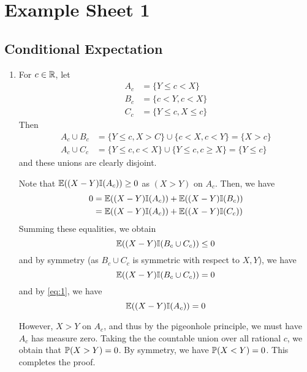 \chapter{Example Sheet 1}
\label{cha:example-sheet-1}

\section{Conditional Expectation}
\label{sec:cond-expect}

\begin{enumerate}
\item For $c \in \mathbb{R}$, let
  \begin{align*}
    A_{c} &= \{ Y \leq c < X \} \\
    B_{c} &= \{ c < Y, c < X \} \\
    C_{c} &= \{ Y \leq c, X \leq c \}
  \end{align*}
  Then
  \begin{align*}
    A_{c} \cup B_{c} &= \{ Y \leq c, X > C \} \cup \{ c < X, c < Y \} =
    \{ X > c \} \\
    A_{c} \cup C_{c} &= \{ Y \leq c, c < X \} \cup \{ Y \leq c, c \geq
    X \} = \{ Y \leq c \}
  \end{align*} and these unions are clearly disjoint.

  Note that $\E{(X-Y)\I{A_{c}}} \geq 0$ as $(X > Y)$ on $A_{c}$. Then,
  we have
  \begin{align}
    \label{eq:1}
    0 &= \E{(X - Y)\I{A_{c}}} + \E{(X-Y)\I{B_{c}}} \\
    &= \E{(X-Y)\I{A_{c}}} + \E{(X-Y)\I{C_{c}}}
  \end{align}
  Summing these equalities, we obtain
  \begin{equation}
    \label{eq:2}
    \E{(X-Y)\I{B_{c} \cup C_{c}}} \leq 0
  \end{equation} and by symmetry (as $B_{c} \cup C_{c}$ is symmetric
  with respect to $X, Y$), we have
  \begin{equation}
    \label{eq:3}
    \E{(X-Y)\I{B_{c} \cup C_{c}}} = 0
  \end{equation} and by \eqref{eq:1}, we have
  \begin{equation}
    \label{eq:4}
    \E{(X-Y)\I{A_{c}}} = 0
  \end{equation}

  However, $X > Y$ on $A_{c}$, and thus by the pigeonhole principle,
  we must have $A_{c}$ has measure zero. Taking the the countable
  union over all rational $c$, we obtain that $\Prob{X > Y} = 0$.  By
  symmetry, we have $\Prob{X < Y} = 0$.  This completes the proof.


\end{enumerate}
